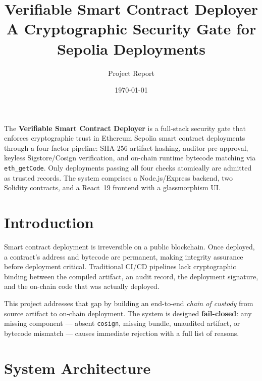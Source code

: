 \documentclass[11pt,a4paper]{article}
\title{\vspace{-1.5em}\textbf{Verifiable Smart Contract Deployer}\\[0.3em]
       \large A Cryptographic Security Gate for Sepolia Deployments}
\author{Project Report}
\date{\today}
\begin{document}
\maketitle\thispagestyle{fancy}\vspace{-1em}

\begin{tcolorbox}[colback=accentcyan!6,colframe=accentcyan!50,
                  fonttitle=\bfseries,title=Abstract,left=4pt,right=4pt,top=3pt,bottom=3pt]
\small
The \textbf{Verifiable Smart Contract Deployer} is a full-stack security gate that enforces
cryptographic trust in Ethereum Sepolia smart contract deployments through a four-factor
pipeline: SHA-256 artifact hashing, auditor pre-approval, keyless Sigstore/Cosign verification,
and on-chain runtime bytecode matching via \texttt{eth\_getCode}. Only deployments passing all
four checks atomically are admitted as trusted records. The system comprises a Node.js/Express
backend, two Solidity contracts, and a React~19 frontend with a glassmorphism UI.
\end{tcolorbox}

\section{Introduction}

Smart contract deployment is irreversible on a public blockchain. Once deployed, a contract's
address and bytecode are permanent, making integrity assurance before deployment critical.
Traditional CI/CD pipelines lack cryptographic binding between the compiled artifact, an audit
record, the deployment signature, and the on-chain code that was actually deployed.

This project addresses that gap by building an end-to-end \textit{chain of custody} from
source artifact to on-chain deployment. The system is designed \textbf{fail-closed}: any
missing component — absent \texttt{cosign}, missing bundle, unaudited artifact, or bytecode
mismatch — causes immediate rejection with a full list of reasons.

\section{System Architecture}
\end{document}
